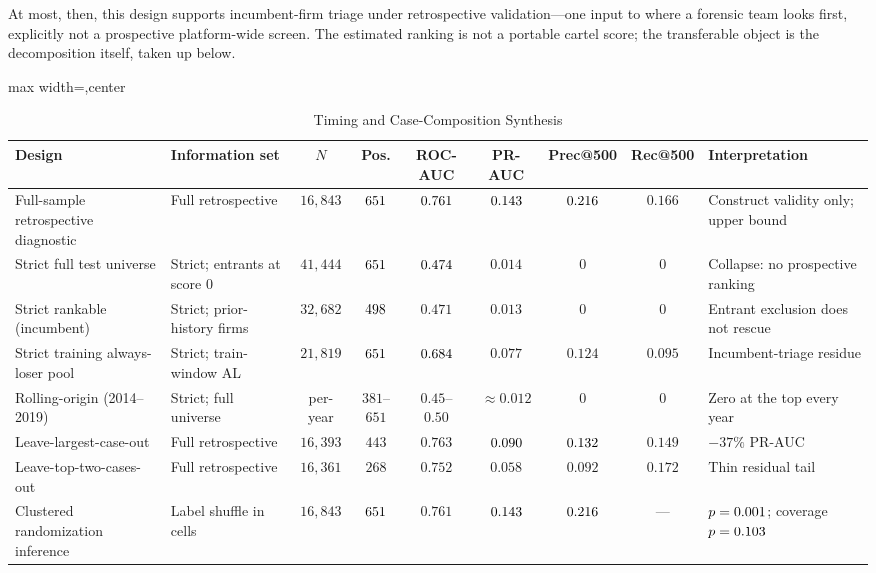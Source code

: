 At most, then, this design supports incumbent-firm triage under
retrospective validation---one input to where a forensic team looks
first, explicitly not a prospective platform-wide screen. The
estimated ranking is not a portable cartel score; the transferable
object is the decomposition itself, taken up below.

\begin{table}[htbp]
\centering
\caption{Timing and Case-Composition Synthesis}
\label{tab:timing_case_holdout}
\scriptsize
\begin{adjustbox}{max width=\textwidth,center}
\begin{threeparttable}
\begin{tabular}{p{2.9cm}p{2.6cm}ccccccp{3.2cm}}
\toprule
Design & Information set & $N$ & Pos. & ROC-AUC & PR-AUC & Prec@500 & Rec@500 & Interpretation \\
\midrule
Full-sample retrospective diagnostic & Full retrospective & $16{,}843$ & $651$ & $0.761$ & $0.143$ & $0.216$ & $0.166$ & Construct validity only; upper bound \\
Strict full test universe & Strict; entrants at score 0 & $41{,}444$ & $651$ & $0.474$ & $0.014$ & $0$ & $0$ & Collapse: no prospective ranking \\
Strict rankable (incumbent) & Strict; prior-history firms & $32{,}682$ & $498$ & $0.471$ & $0.013$ & $0$ & $0$ & Entrant exclusion does not rescue \\
Strict training always-loser pool & Strict; train-window AL & $21{,}819$ & $651$ & $0.684$ & $0.077$ & $0.124$ & $0.095$ & Incumbent-triage residue \\
Rolling-origin (2014--2019) & Strict; full universe & per-year & $381$--$651$ & $0.45$--$0.50$ & $\approx 0.012$ & $0$ & $0$ & Zero at the top every year \\
Leave-largest-case-out & Full retrospective & $16{,}393$ & $443$ & $0.763$ & $0.090$ & $0.132$ & $0.149$ & $-37\%$ PR-AUC \\
Leave-top-two-cases-out & Full retrospective & $16{,}361$ & $268$ & $0.752$ & $0.058$ & $0.092$ & $0.172$ & Thin residual tail \\
Clustered randomization inference & Label shuffle in cells & $16{,}843$ & $651$ & $0.761$ & $0.143$ & $0.216$ & --- & $p=0.001$; coverage $p=0.103$ \\

\end{tabular}
\end{threeparttable}
\end{adjustbox}
\end{table}
